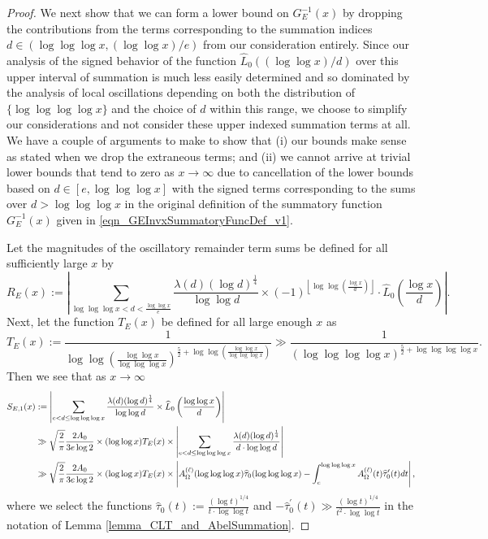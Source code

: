 \documentclass[11pt,reqno,a4letter]{article}
\numberwithin{figure}{section}
\numberwithin{table}{section}
\newcommand{\floor}[1]{\left\lfloor #1 \right\rfloor}
\theoremstyle{plain}
\numberwithin{theorem}{section}
\theoremstyle{definition}
\begin{document}
\begin{proof}
We next show that we can form a lower bound on $G_E^{-1}(x)$ by dropping the contributions 
from the terms corresponding to the summation indices 
$d \in \left(\log\log\log x, (\log\log x) / e\right)$ from our consideration entirely. 
Since our analysis of the signed behavior of the function 
$\widehat{L}_0\left((\log\log x) / d\right)$ over this upper interval of summation is much less 
easily determined and so dominated by the analysis of 
local oscillations depending on both the distribution of 
$\{\log\log\log\log x\}$ and the choice of $d$ within this range, we choose to simplify our considerations 
and not consider these upper indexed summation terms at all. We have a couple of arguments to make to show that 
(i) our bounds make sense as stated when we drop the extraneous terms; and (ii) we cannot 
arrive at trivial lower bounds that tend to zero as $x \rightarrow \infty$ due to cancellation of the 
lower bounds based on $d \in [e, \log\log\log x]$ with the signed terms corresponding to the sums over 
$d > \log\log\log x$ in the original definition of the summatory function $G_E^{-1}(x)$ given in 
\eqref{eqn_GEInvxSummatoryFuncDef_v1}. 

Let the magnitudes of the oscillatory remainder term sums be defined for all sufficiently large $x$ by 
\[
R_E(x) := \left\lvert \sum_{\log\log\log x < d < \frac{\log\log x}{e}} 
     \frac{\lambda(d) (\log d)^{\frac{1}{4}}}{\log\log d} \times 
     (-1)^{\floor{\log\log\left(\frac{\log x}{d}\right)}} \cdot 
     \widehat{L}_0\left(\frac{\log x}{d}\right) \right\rvert. 
\]
Next, let the function $T_E(x)$ be defined for all large enough $x$ as 
\begin{equation} 
\label{eqn_proof_tag_TExFuncDefAndBounds_v1} 
T_E(x) := \frac{1}{\log\log\left(\frac{\log\log x}{\log\log\log x}\right)^{ 
     \frac{5}{2} + \log\log\left(\frac{\log\log x}{\log\log\log x}\right)}} 
     \gg \frac{1}{(\log\log\log\log x)^{\frac{5}{2} + \log\log\log\log x}}. 
\end{equation} 
Then we see that as $x \rightarrow \infty$ 
\begin{align} 
\notag 
S_{E,1}(x) & := \left\lvert \sum_{e < d \leq \log\log\log x} 
     \frac{\lambda(d) (\log d)^{\frac{1}{4}}}{\log\log d} \times 
     \widehat{L}_0\left(\frac{\log\log x}{d}\right) 
     \right\rvert \\ 
\label{eqn_proof_tag_SE1xFuncExp_v1} 
     & \gg \sqrt{\frac{2}{\pi}} \frac{2 A_0}{3e \log 2} \times (\log\log x) T_E(x) \times 
     \left\lvert \sum_{e < d \leq \log\log\log x} 
     \frac{\lambda(d) (\log d)^{\frac{1}{4}}}{d \cdot \log\log d} 
     \right\rvert \\ 
\notag 
     & \gg \sqrt{\frac{2}{\pi}} \frac{2 A_0}{3e \log 2} \times (\log\log x) T_E(x) \times 
     \left\lvert A_{\Omega}^{(\ell)}(\log\log\log x) \widehat{\tau}_0(\log\log\log x) - 
     \int_e^{\log\log\log x} A_{\Omega}^{(\ell)}(t) \widehat{\tau}_0^{\prime}(t) dt 
     \right\rvert, 
\end{align} 
where we select the functions $\widehat{\tau}_0(t) := \frac{(\log t)^{1/4}}{t \cdot \log\log t}$ and 
$-\widehat{\tau}^{\prime}_0(t) \gg \frac{(\log t)^{1/4}}{t^2 \cdot \log\log t}$ in the notation of 
Lemma \ref{lemma_CLT_and_AbelSummation}. 


\end{proof}
\end{document}
